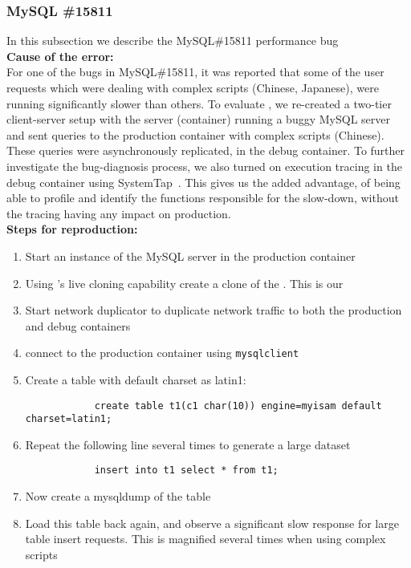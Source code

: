 \subsubsection{MySQL \#15811}

In this subsection we describe the MySQL\#15811 performance bug \\

\noindent \textbf{Cause of the error:} \\

For one of the bugs in  MySQL\#15811, it was reported that some of the user requests which were dealing with complex scripts (Chinese, Japanese), were running significantly slower than others.
To evaluate \parikshan, we re-created a two-tier client-server setup with the server (container) running a buggy MySQL server and sent queries to the production container with complex scripts (Chinese).
These queries were asynchronously replicated, in the debug container. To further investigate the bug-diagnosis process, we also turned on execution tracing in the debug container using SystemTap~\cite{systemtap}.
This gives us the added advantage, of being able to profile and identify the functions responsible for the slow-down, without the tracing having any impact on production.\\

\noindent \textbf{Steps for reproduction:} \\

\begin{adjustwidth}{0.5cm}{}
	\begin{enumerate}
		\item Start an instance of the MySQL server in the production container
		\item Using \parikshan's live cloning capability create a clone of the \productioncontainer. This is our \debugcontainer
		\item Start network duplicator to duplicate network traffic to both the production and debug containers
		\item connect to the production container using \texttt{mysqlclient}
		\item Create a table with default charset as latin1:
			
			\begin{lstlisting}
			create table t1(c1 char(10)) engine=myisam default charset=latin1;
			\end{lstlisting}
			
		\item Repeat the following line several times to generate a large dataset
		
			\begin{lstlisting}
			insert into t1 select * from t1;
			\end{lstlisting}
	
		\item Now create a mysqldump of the table
		\item Load this table back again, and observe a significant slow response for large table insert requests. This is magnified several times when using complex scripts
	\end{enumerate}
\end{adjustwidth}	



